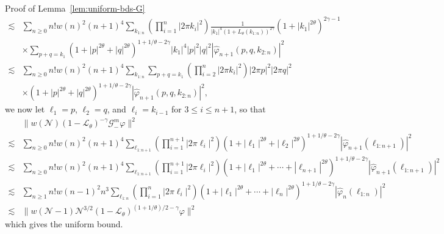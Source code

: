 \documentclass[10pt]{article}
\newenvironment{proof*}[1]{\noindent\textbf{#1\ }}{\hspace*{\fill}$\Box$\medskip}
\begin{document}
\begin{proof*}{Proof of Lemma~\ref{lem:uniform-bds-G}}
\[\begin{array}{ll}
       \lesssim & \sum_{n \geqslant 0} n! w (n)^2 (n + 1)^4 \sum_{k_{1 : n}}
       \left( \prod_{i = 1}^n | 2 \pi k_i |^2 \right) \frac{1}{| k_1 |^4 (1 +
       L_{\theta} (k_{1 : n}))^{2 \gamma}} (1 + | k_1 |^{2 \theta})^{2 \gamma
       - 1}\\
       & \times \sum_{p + q = k_1} (1 + | p |^{2 \theta} + | q |^{2
       \theta})^{1 + 1 / \theta - 2 \gamma} | k_1 |^4 | p |^2 | q |^2 |
       \hat{\varphi}_{n + 1} (p, q, k_{2 : n}) |^2\\
       \lesssim & \sum_{n \geqslant 0} n! w (n)^2 (n + 1)^4 \sum_{k_{1 : n}}
       \sum_{p + q = k_1} \left( \prod_{i = 2}^n | 2 \pi k_i |^2 \right) | 2
       \pi p |^2 | 2 \pi q |^2\\
       & \times (1 + | p |^{2 \theta} + | q |^{2 \theta})^{1 + 1 / \theta - 2
       \gamma} | \hat{\varphi}_{n + 1} (p, q, k_{2 : n}) |^2,
     \end{array} \]
  we now let $\ell_1 = p$, $\ell_2 = q$, and $\ell_i = k_{i - 1}$ for $3
  \leqslant i \leqslant n + 1$, so that
  \[ \begin{array}{ll}
       & \| w (\mathcal{N}) (1 -\mathcal{L}_{\theta})^{- \gamma}
       \mathcal{G}_-^m \varphi \|^2\\
       \lesssim & \sum_{n \geqslant 0} n! w (n)^2 (n + 1)^4 \sum_{\ell_{1 : n
       + 1}} \left( \prod_{i = 1}^{n + 1} | 2 \pi \ell_i |^2 \right) (1 + |
       \ell_1 |^{2 \theta} + | \ell_2 |^{2 \theta})^{1 + 1 / \theta - 2
       \gamma} | \hat{\varphi}_{n + 1} (\ell_{1 : n + 1}) |^2\\
       \lesssim & \sum_{n \geqslant 0} n! w (n)^2 (n + 1)^4 \sum_{\ell_{1 : n
       + 1}} \left( \prod_{i = 1}^{n + 1} | 2 \pi \ell_i |^2 \right) (1 + |
       \ell_1 |^{2 \theta} + \cdots + | \ell_{n + 1} |^{2 \theta})^{1 + 1 /
       \theta - 2 \gamma} | \hat{\varphi}_{n + 1} (\ell_{1 : n + 1}) |^2\\
       \lesssim & \sum_{n \geqslant 1} n! w (n - 1)^2 n^3 \sum_{\ell_{1 : n}}
       \left( \prod_{i = 1}^n | 2 \pi \ell_i |^2 \right) (1 + | \ell_1 |^{2
       \theta} + \cdots + | \ell_n |^{2 \theta})^{1 + 1 / \theta - 2 \gamma} |
       \hat{\varphi}_n (\ell_{1 : n}) |^2\\
       \lesssim & \| w (\mathcal{N}- 1) \mathcal{N}^{3 / 2} (1
       -\mathcal{L}_{\theta})^{(1 + 1 / \theta) / 2 - \gamma} \varphi \|^2
     \end{array} \]
  which gives the uniform bound.
  
  \
  

\end{proof*}
\end{document}
